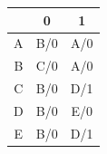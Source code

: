 \documentclass[a4paper]{article}
\theoremstyle{break}
\theoremstyle{break}
\theoremstyle{break}
\theoremstyle{break}
\begin{document}
\begin{exercise}
  \begin{table}[H]
    \begin{center}
      \begin{tabular}{c|c|c}
        & 0 & 1 \\
        \hline
        A & B/0 & A/0 \\
        \hline
        B & C/0 & A/0 \\
        \hline
        C & B/0 & D/1 \\
        \hline
        D & B/0 & E/0 \\
        \hline
        E & B/0 & D/1 \\
      \end{tabular}
    \end{center}
  \end{table}
\end{exercise}
\end{document}
